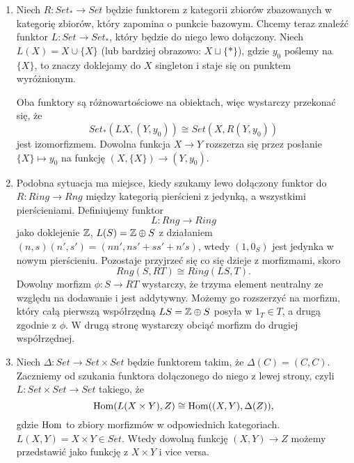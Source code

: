 \begin{enumerate}
  \item Niech $R:Set_*\to Set$ będzie funktorem z kategorii zbiorów zbazowanych w kategorię zbiorów, który zapomina o punkcie bazowym. Chcemy teraz znaleźć funktor $L:Set\to Set_*$, który będzie do niego lewo dołączony. Niech $L(X)=X\cup\{X\}$ (lub bardziej obrazowo: $X\sqcup\{*\}$), gdzie $y_0$ poślemy na $\{X\}$, to znaczy doklejamy do $X$ singleton i staje się on punktem wyróżnionym. 

    Oba funktory są różnowartościowe na obiektach, więc wystarczy przekonać się, że
    $$Set_*(LX, (Y, y_0))\cong Set(X, R(Y, y_0))$$
    jest izomorfizmem. Dowolna funkcja $X\to Y$ rozszerza się przez posłanie $\{X\}\mapsto y_0$ na funkcję $(X, \{X\})\to (Y, y_0)$.
  \item Podobna sytuacja ma miejsce, kiedy szukamy lewo dołączony funktor do $R:Ring\to Rng$ między kategorią pierścieni z jedynką, a wszystkimi pierścieniami. Definiujemy funktor 
    $$L:Rng\to Ring$$
    jako doklejenie $\mathbb{Z}$, $L(S)=\mathbb{Z}\oplus S$ z działaniem $(n, s)(n', s')=(nn', ns'+ss'+n's)$, wtedy $(1, 0_S)$ jest jedynka w nowym pierścieniu. Pozostaje przyjrzeć się co się dzieje z morfizmami, skoro
    $$Rng(S, RT)\cong Ring(LS, T).$$
    Dowolny morfizm $\phi:S\to RT$ wystarczy, że trzyma element neutralny ze względu na dodawanie i jest addytywny. Możemy go rozszerzyć na morfizm, który całą pierwszą współrzędną $LS=\mathbb{Z}\oplus S$ posyła w $1_T\in T$, a drugą zgodnie z $\phi$. W drugą stronę wystarczy obciąć morfizm do drugiej współrzędnej.
  \item Niech $\Delta:Set\to Set\times Set$ będzie funktorem takim, że  $\Delta(C)=(C, C)$. Zaczniemy od szukania funktora dołączonego do niego z lewej strony, czyli $L:Set\times Set\to Set$ takiego, że
    $$\operatorname{Hom}(L(X\times Y), Z)\cong \operatorname{Hom}((X, Y), \Delta(Z)),$$
    gdzie $\operatorname{Hom}$ to zbiory morfizmów w odpowiednich kategoriach. $L(X, Y)=X\times Y\in Set$. Wtedy dowolną funkcję $(X, Y)\to Z$ możemy przedstawić jako funkcję z $X\times Y$ i vice versa.
\end{enumerate}
\bigskip


